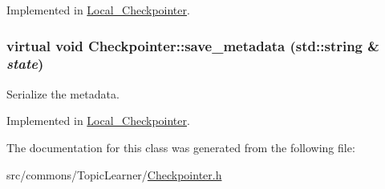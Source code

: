 Implemented in \hyperlink{class_local___checkpointer_a3a2bdc4e2afa1434605c69c3f46db69f}{Local\_\-Checkpointer}.

\hypertarget{class_checkpointer_a2dd3cfe87847c8e3d1dac001c8d75a8c}{
\subsubsection[{save\_\-metadata}]{\setlength{\rightskip}{0pt plus 5cm}virtual void Checkpointer::save\_\-metadata (std::string \& {\em state})}}
\label{class_checkpointer_a2dd3cfe87847c8e3d1dac001c8d75a8c}


Serialize the metadata. 



Implemented in \hyperlink{class_local___checkpointer_a9539be451ec14462873da2658e3ead80}{Local\_\-Checkpointer}.



The documentation for this class was generated from the following file:\begin{DoxyCompactItemize}
\item 
src/commons/TopicLearner/\hyperlink{_checkpointer_8h}{Checkpointer.h}\end{DoxyCompactItemize}
